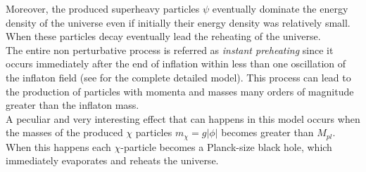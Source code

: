 \documentclass[11pt,a4paper,twoside]{book}
\begin{document}
Moreover, the produced superheavy particles $\psi$ eventually dominate the energy density of the universe even if initially their energy density was relatively small. When these particles decay eventually lead the reheating of the universe.\\
The entire non perturbative process is referred as \textit{instant preheating} since it occurs immediately after the end of inflation within less than one oscillation of the inflaton field (see \cite{Chap4:InstantPreheating} for the complete detailed model).  This process can lead to the production of particles with momenta and masses many orders of magnitude greater than the inflaton mass.\\
A peculiar and very interesting effect that can happens in this model occurs when the masses of the produced $\chi$ particles $ m_{\chi}=g|\phi| $ becomes greater than $ M_{pl} $. When this happens each $\chi$-particle becomes a Planck-size black hole, which immediately evaporates and reheats the universe.
\end{document}
